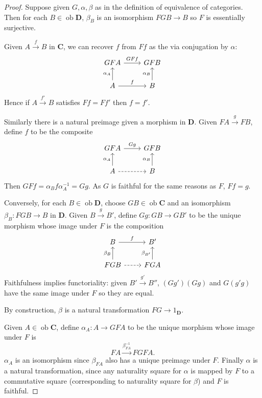 \documentclass[a4paper]{article}
\renewcommand{\c}[1]{\mathbf{#1}}
\DeclareMathOperator{\ob}{ob}
\begin{document}
\begin{proof}
  Suppose given \(G, \alpha, \beta\) as in the definition of equivalence of categories. Then for each \(B \in \ob \c D\), \(\beta_B\) is an isomorphism \(FGB \to B\) so \(F\) is essentially surjective.

  Given \(A \xrightarrow{f} B\) in \(\c C\), we can recover \(f\) from \(Ff\) as the via conjugation by \(\alpha\):
  \[
    \begin{tikzcd}
      GFA \ar[r, "GFf"] & GFB \\
      A \ar[u, "\alpha_A"] \ar[r, "f"] & B \ar[u, "\alpha_B"]
    \end{tikzcd}
  \]
  Hence if \(A \xrightarrow{f'} B\) satisfies \(Ff = Ff'\) then \(f = f'\).

  Similarly there is a natural preimage given a morphism in \(\c D\). Given \(FA \xrightarrow{g} FB\), define \(f\) to be the composite
  \[
    \begin{tikzcd}
      GFA \ar[r, "Gg"] & GFB \\
      A \ar[u, "\alpha_A"] \ar[r, dashed] & B \ar[u, "\alpha_B"]
    \end{tikzcd}
  \]
  Then \(GFf = \alpha_B f \alpha_A^{-1} = Gg\). As \(G\) is faithful for the same reasons as \(F\), \(Ff = g\).

  Conversely, for each \(B \in \ob \c D\), choose \(GB \in \ob \c C\) and an isomorphism \(\beta_B: FGB \to B\) in \(\c D\). Given \(B \xrightarrow{g} B'\), define \(Gg: GB \to GB'\) to be the unique morphism whose image under \(F\) is the composition
  \[
    \begin{tikzcd}
      B \ar[r, "f"] & B' \\
      FGB \ar[u, "\beta_B"] \ar[r, dashed] & FGA \ar[u, "\beta_{B'}"]
    \end{tikzcd}
  \]
  Faithfulness implies functoriality: given \(B' \xrightarrow{g'} B''\), \((Gg') (Gg)\) and \(G(g'g)\) have the same image under \(F\) so they are equal.

  By construction, \(\beta\) is a natural transformation \(FG \to 1_{\c D}\).

  Given \(A \in \ob \c C\), define \(\alpha_A: A \to GFA\) to be the unique morphism whose image under \(F\) is
  \[
    FA \xrightarrow{\beta_{FA}^{-1}} FGFA.
  \]
  \(\alpha_A\) is an isomorphism since \(\beta_{FA}\) also has a unique preimage under \(F\). Finally \(\alpha\) is a natural transformation, since any naturality square for \(\alpha\) is mapped by \(F\) to a commutative square (corresponding to naturality square for \(\beta\)) and \(F\) is faithful.
\end{proof}
\end{document}
